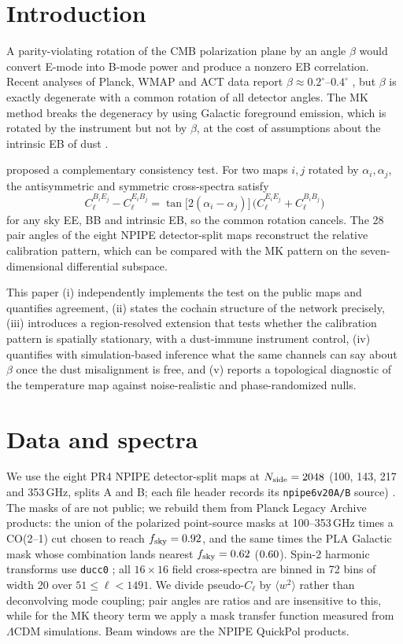 \documentclass[twocolumn]{aastex631}
\begin{document}
\section{Introduction}
A parity-violating rotation of the CMB polarization plane by an angle $\beta$ would convert E-mode
into B-mode power and produce a nonzero EB correlation. Recent analyses of Planck, WMAP and ACT
data report $\beta\approx0.2^\circ$--$0.4^\circ$ \citep{mk2020,dp2022,ek2022,act2025}, but $\beta$
is exactly degenerate with a common rotation of all detector angles. The MK method
\citep{mk2019,mk2020} breaks the degeneracy by using Galactic foreground emission, which is rotated
by the instrument but not by $\beta$, at the cost of assumptions about the intrinsic EB of dust
\citep{clark2021}.

\citet{lka2026} proposed a complementary consistency test. For two maps $i,j$ rotated by
$\alpha_i,\alpha_j$, the antisymmetric and symmetric cross-spectra satisfy
\begin{equation}
C_\ell^{B_iE_j}-C_\ell^{E_iB_j}=\tan\!\big[2(\alpha_i-\alpha_j)\big]\,\big(C_\ell^{E_iE_j}+C_\ell^{B_iB_j}\big)
\end{equation}
for any sky EE, BB and intrinsic EB, so the common rotation cancels. The 28 pair angles of the
eight NPIPE detector-split maps reconstruct the relative calibration pattern, which can be
compared with the MK pattern on the seven-dimensional differential subspace.

This paper (i) independently implements the test on the public maps and quantifies agreement,
(ii) states the cochain structure of the network precisely, (iii) introduces a
region-resolved extension that tests whether the calibration pattern is spatially stationary,
with a dust-immune instrument control, (iv) quantifies with simulation-based inference what the
same channels can say about $\beta$ once the dust misalignment is free, and (v) reports a
topological diagnostic of the temperature map against noise-realistic and phase-randomized
nulls.

\section{Data and spectra}
We use the eight PR4 NPIPE detector-split maps at $N_{\rm side}=2048$ (100, 143, 217 and 353\,GHz,
splits A and B; each file header records its \texttt{npipe6v20A/B} source) \citep{npipe2020}.
The masks of \citet{lka2026} are not public; we rebuild them from Planck Legacy Archive products:
the union of the polarized point-source masks at 100--353\,GHz times a CO(2--1) cut chosen to
reach $f_{\rm sky}=0.92$, and the same times the PLA Galactic mask whose combination lands
nearest $f_{\rm sky}=0.62$ ($0.60$). Spin-2 harmonic transforms use \texttt{ducc0}
\citep{ducc}; all $16\times16$ field cross-spectra are binned in 72 bins of width 20 over
$51\le\ell<1491$. We divide pseudo-$C_\ell$ by $\langle w^2\rangle$ rather than deconvolving mode
coupling; pair angles are ratios and are insensitive to this, while for the MK theory term we
apply a mask transfer function measured from $\Lambda$CDM simulations. Beam windows are the NPIPE
QuickPol products.
\end{document}
